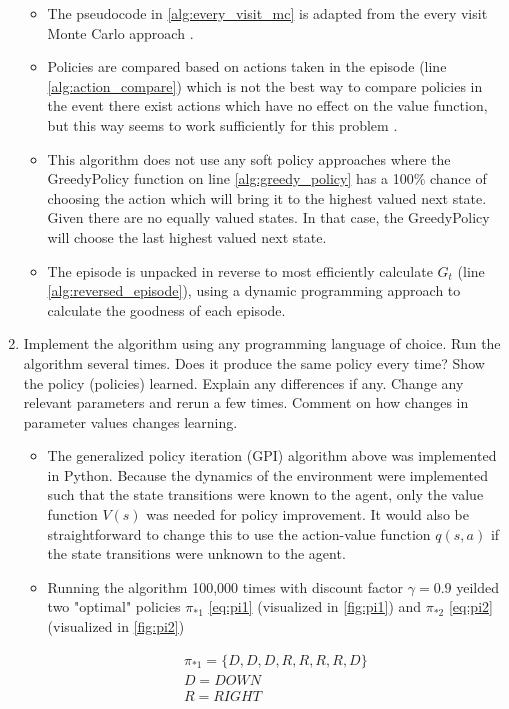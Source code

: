\documentclass[letterpaper]{article} %
\begin{document}
\begin{enumerate}
	\begin{itemize}
	    \item The pseudocode in \ref{alg:every_visit_mc} is adapted from the every visit Monte Carlo approach \cite{SuttonBartoRLBook}.
	    \item Policies are compared based on actions taken in the episode (line \ref{alg:action_compare}) which is not the best way to compare policies in the event there exist actions which have no effect on the value function, but this way seems to work sufficiently for this problem \cite{Morales2020GrokkingDL}.
	    \item This algorithm does not use any soft policy approaches where the GreedyPolicy function on line \ref{alg:greedy_policy} has a 100\% chance of choosing the action which will bring it to the highest valued next state. Given there are no equally valued states. In that case, the GreedyPolicy will choose the last highest valued next state.
	    \item The episode is unpacked in reverse to most efficiently calculate $G_t$ (line \ref{alg:reversed_episode}), using a dynamic programming approach to calculate the goodness of each episode.
	\end{itemize}

    \item Implement the algorithm using any programming language of choice. Run the algorithm several times. Does it produce the same policy every time? Show the policy (policies) learned. Explain any differences if any. Change any relevant parameters and rerun a few times. Comment on how changes in parameter values changes learning.
	\begin{itemize}
	    \item The generalized policy iteration (GPI) algorithm above was implemented in Python. Because the dynamics of the environment were implemented such that the state transitions were known to the agent, only the value function $V(s)$ was needed for policy improvement. It would also be straightforward to change this to use the action-value function $q(s,a)$ if the state transitions were unknown to the agent.
	    \item Running the algorithm 100,000 times with discount factor $\gamma=0.9$ yeilded two "optimal" policies $\pi_{*1}$ \ref{eq:pi1} (visualized in \ref{fig:pi1}) and $\pi_{*2}$ \ref{eq:pi2} (visualized in \ref{fig:pi2})

	    \begin{gather}
		\pi_{*1} = \{D,D,D,R,R,R,R,D\} \\
		D = DOWN \\
		R = RIGHT
	    \label{eq:pi1}
	    \end{gather}


\end{itemize}
\end{enumerate}
\end{document}
